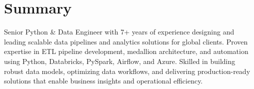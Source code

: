 \section{Summary}
\hspace{4mm}\begin{minipage}[t]{0.97\textwidth}
Senior Python \& Data Engineer with 7+ years of experience designing and leading scalable data pipelines and analytics solutions for global clients. Proven expertise in ETL pipeline development, medallion architecture, and automation using Python, Databricks, PySpark, Airflow, and Azure. Skilled in building robust data models, optimizing data workflows, and delivering production-ready solutions that enable business insights and operational efficiency.
\end{minipage}